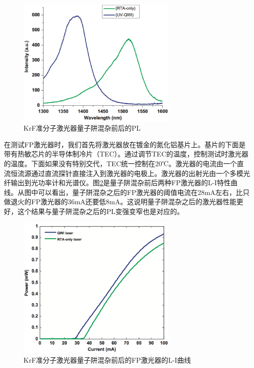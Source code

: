 \documentclass{ZJUthesis}
\begin{document}
\begin{figure}[!t]
    \centering
    \includegraphics[width=0.7\textwidth]{./Pictures/fp_shift.eps}
    \caption{KrF准分子激光器量子阱混杂前后的PL}
    \label{fig_fp_shift}
\end{figure}

在测试FP激光器时，我们首先将激光器放在镀金的氮化铝基片上。基片的下面是带有热敏芯片的半导体制冷片（TEC）。通过调节TEC的温度，控制测试时激光器的温度。下面如果没有特别交代，TEC统一控制在20℃。激光器的电流由一个直流恒流源通过直流探针直接注入到激光器的电极上。激光器的出射光由一个多模光纤输出到光功率计和光谱仪。图\ref{fig_fp_li}是量子阱混杂前后两种FP激光器的L-I特性曲线。从图中可以看出，量子阱混杂之后的FP激光器的阈值电流在28mA左右，比只做退火的FP激光器的36mA还要低8mA。这说明量子阱混杂之后的激光器性能更好，这个结果与量子阱混杂之后的PL变强变窄也是对应的。

\begin{figure}[!t]
    \centering
    \includegraphics[width=0.7\textwidth]{./Pictures/fp_li.eps}
    \caption{KrF准分子激光器量子阱混杂前后的FP激光器的L-I曲线}
    \label{fig_fp_li}
\end{figure}
\end{document}
